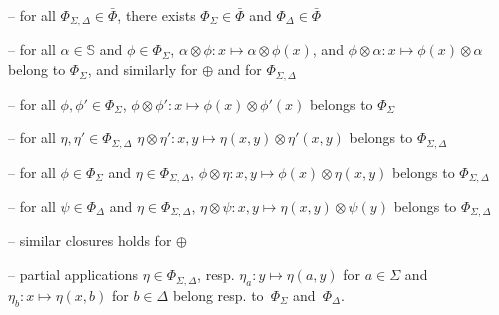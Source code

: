 \documentclass[runningheads]{llncs}
\newcommand{\Semiring}{\mathbb{S}}
\begin{document}
\noindent -- 
for all $\Phi_{\Sigma, \Delta} \in \bar\Phi$, there exists 
$\Phi_{\Sigma} \in \bar\Phi$ and $\Phi_{\Delta} \in \bar\Phi$

\noindent -- 
for all $\alpha \in \Semiring$ and $\phi \in \Phi_\Sigma$,
      $\alpha \otimes \phi : x \mapsto \alpha \otimes \phi(x)$, 
      and $\phi \otimes \alpha : x \mapsto \phi(x) \otimes \alpha$\\
\phantom{--} belong to $\Phi_\Sigma$, and similarly for $\oplus$ 
      and for $\Phi_{\Sigma, \Delta}$

\noindent -- 
for all $\phi, \phi' \in \Phi_\Sigma$,
$\phi \otimes \phi': x \mapsto \phi(x) \otimes \phi'(x)$ belongs to $\Phi_\Sigma$

\noindent -- 
for all $\eta, \eta' \in \Phi_{\Sigma, \Delta}$
$\eta \otimes \eta': x, y \mapsto \eta(x, y) \otimes \eta'(x, y)$ belongs to $\Phi_{\Sigma, \Delta}$

\noindent -- 
for all $\phi \in \Phi_\Sigma$ and $\eta \in \Phi_{\Sigma, \Delta}$,
$\phi \otimes \eta: x, y \mapsto \phi(x) \otimes \eta(x, y)$ belongs to $\Phi_{\Sigma, \Delta}$

\noindent -- 
for all $\psi \in \Phi_\Delta$ and $\eta \in \Phi_{\Sigma, \Delta}$,
$\eta \otimes \psi: x, y \mapsto \eta(x, y) \otimes \psi(y)$ belongs to $\Phi_{\Sigma, \Delta}$

\noindent -- 
similar closures holds for $\oplus$

\noindent -- 
partial applications $\eta \in \Phi_{\Sigma, \Delta}$, 
resp. $\eta_a: y \mapsto \eta(a, y)$ for $a \in \Sigma$ %
and\\
\phantom{--} $\eta_b: x \mapsto \eta(x, b)$ for $b \in \Delta$ %
belong resp. to~$\Phi_\Sigma$ and~$\Phi_\Delta$.
\end{document}
